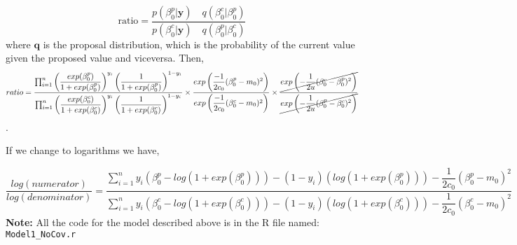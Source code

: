 \documentclass[10pt]{article}
\begin{document}
\[ \text{ratio}=\dfrac{p(\beta_0^p|\textbf{y})\quad q(\beta_0^c|\beta_0^p)}{p(\beta_0^c|\textbf{y}) \quad q(\beta_0^p|\beta_0^c)} \]
 where $\textbf{q}$ is the proposal distribution, which is the probability of the current value given the proposed value and viceversa. Then,
\[
ratio=\dfrac{\prod_{i=1}^n\left(\dfrac{exp(\beta_0^p)}{1+exp(\beta_0^p)}\right)^{y_i}\left( \dfrac{1}{1+exp(\beta_0^p)}\right)^{1-y_i}}{\prod_{i=1}^n\left(\dfrac{exp(\beta_0^c)}{1+exp(\beta_0^c)}\right)^{y_i}\left( \dfrac{1}{1+exp(\beta_0^c)}\right)^{1-y_i}}\times \dfrac{exp\left(\dfrac{-1}{2c_0}(\beta_0^p-m_0)^2\right)}{exp\left(\dfrac{-1}{2c_0}(\beta_0^c-m_0)^2\right)}\times \dfrac{\cancel{exp\left(-\dfrac{1}{2u}(\beta_{0}^c-\beta_{0}^p)^2\right)}}{\cancel{exp\left(-\dfrac{1}{2u}(\beta_{0}^p-\beta_{0}^c)^2\right)}}\].

If we change to logarithms we have,

\[ \dfrac{log(numerator)}{log(denominator)}=
 \dfrac{\sum_{i=1}^n y_i(\beta_0^p-log(1+exp(\beta_0^p)))- (1-y_i)(log(1+exp(\beta_0^p)))-\dfrac{1}{2c_0}(\beta_0^p-m_0)^2}{\sum_{i=1}^n y_i(\beta_0^c-log(1+exp(\beta_0^c)))- (1-y_i)(log(1+exp(\beta_0^c)))-\dfrac{1}{2c_0}(\beta_0^c-m_0)^2}
\]
\textbf{Note:} All the code for the model described above is in the R file named: \texttt{Model1\_NoCov.r}
\end{document}
